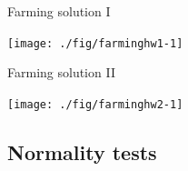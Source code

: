 \documentclass[xcolor=table,       handout,    xcolor=dvipsnames]{beamer}\usepackage[]{graphicx}\usepackage[]{color}
\newenvironment{knitrout}{}{} %
\begin{document}
\begin{frame}{Farming solution I}
\begin{knitrout}
\color{fgcolor}

{\centering \texttt{[image: ./fig/farminghw1-1]} 

}



\end{knitrout}
\end{frame}


\begin{frame}{Farming solution II}
\begin{knitrout}
\color{fgcolor}

{\centering \texttt{[image: ./fig/farminghw2-1]} 

}



\end{knitrout}
\end{frame}


\subsection{Normality tests}
\end{document}
